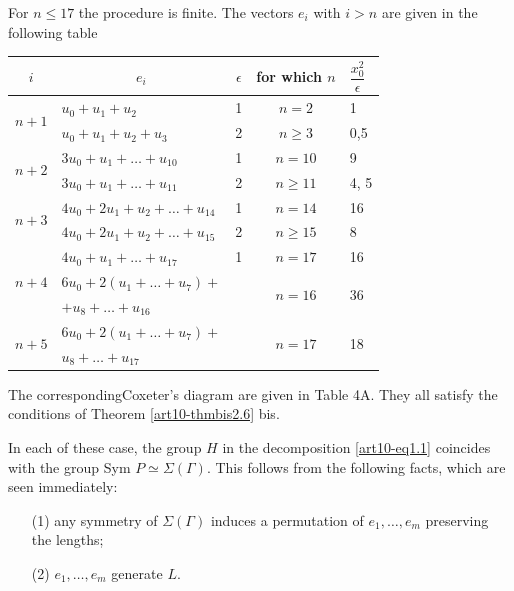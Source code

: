 \begin{enumerate}
For $n \leqslant 17$ the procedure is finite. The vectors $e_i$ with $i > n$ are given in the following table
{
\fontsize{9}{11}\selectfont
\renewcommand{\arraystretch}{1.2}
\tabcolsep=10pt
\begin{longtable}{@{}c|l|c|c|l@{}}
\hline
$i$ & \multicolumn{1}{c|}{$e_i$} & $\epsilon$ & for which $n$ & $\dfrac{x^2_0}{\epsilon}$\\\hline
\multirow{2}{0.8cm}{$n+1$} &  $u_0 + u_1 + u_2$ & 1 & $n=2$ & 1\\
& $u_0 + u_1 + u_2 + u_3$ & 2 & $n \geqslant 3$ & 0,5\\\hline
\multirow{2}{0.8cm}{$n+2$} & $3 u_0 + u_1 + \ldots + u_{10}$ & 1 & $n=10 $ & 9 \\
& $3u_0 + u_1 + \ldots + u_{11}$ & 2 & $n \geqslant 11$ & 4, 5\\\hline
\multirow{2}{0.8cm}{$n+3$} & $4u_0 + 2 u_1 + u_2 + \ldots + u_{14}$ & 1 & $n=14$ & 16\\
& $4 u_0 + 2 u_1 + u_2 + \ldots + u_{15}$ & 2 & $n \geqslant 15$ & 8\\\hline
\multirow{3}{0.8cm}{$n+4$} & $4 u_0 + u_1 + \ldots + u_{17}$ & 1 & $n=17$ & 16\\
& $6u_0 + 2 (u_1 + \ldots + u_7) + $ & \multirow{2}{0.8cm}{\;\;1} & \multirow{2}{1.5cm}{\;\;$n=16$} & \multirow{2}{0.8cm}{36}\\[-0.2cm]
& \quad $+ u_8 + \ldots + u_{16}$ &  & & \\\hline
\multirow{2}{0.8cm}{$n+5$} & $6u_0 + 2 (u_1 + \ldots + u_7) +$  & \multirow{2}{0.8cm}{\;\;2}  & \multirow{2}{1.5cm}{\;\;$n=17$} & \multirow{2}{0.8cm}{18}\\[-0.2cm]
& \quad $u_8 + \ldots + u_{17}$ & & & \\\hline
\end{longtable}}\relax

The corresponding\pageoriginale Coxeter's diagram are given in Table 4A. They all satisfy the conditions of Theorem \ref{art10-thmbis2.6} bis.

In each of these case, the group $H$ in the decomposition \eqref{art10-eq1.1} coincides with the group Sym $P \simeq \Sigma (\Gamma)$. This follows from the following facts, which are seen immediately:
\begin{itemize}
\item[(1)] any symmetry of $\Sigma (\Gamma)$ induces a permutation of $e_1, \ldots, e_m$ preserving the lengths;

\item[(2)] $e_1, \ldots, e_m$ generate $L$.
\end{itemize}


\end{enumerate}
